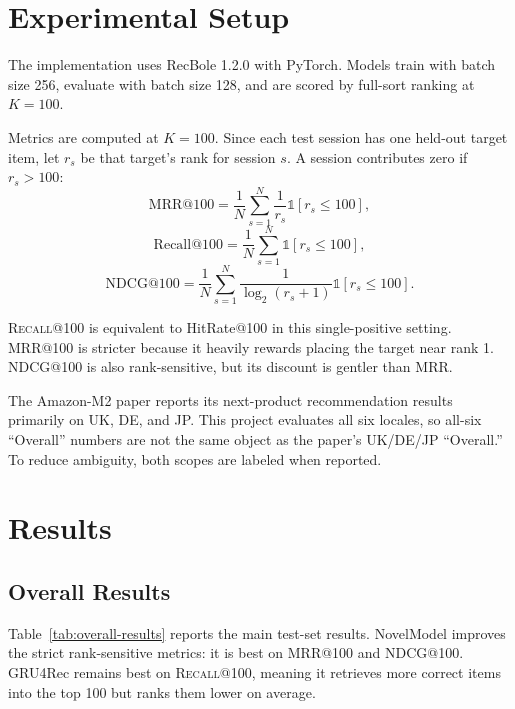 \documentclass[11pt]{article}
\newcommand{\metric}[1]{\textsc{#1}}
\begin{document}
\section{Experimental Setup}

The implementation uses RecBole 1.2.0 with PyTorch. Models train with batch size 256, evaluate with batch size 128, and are scored by full-sort ranking at \(K=100\).

Metrics are computed at \(K=100\). Since each test session has one held-out target item, let \(r_s\) be that target's rank for session \(s\). A session contributes zero if \(r_s > 100\):
\[
  \mathrm{MRR@100}
  = \frac{1}{N}\sum_{s=1}^{N}
    \frac{1}{r_s}\mathbb{1}[r_s \le 100],
\]
\[
  \mathrm{Recall@100}
  = \frac{1}{N}\sum_{s=1}^{N}
    \mathbb{1}[r_s \le 100],
\]
\[
  \mathrm{NDCG@100}
  = \frac{1}{N}\sum_{s=1}^{N}
    \frac{1}{\log_2(r_s+1)}\mathbb{1}[r_s \le 100].
\]

\metric{Recall@100} is equivalent to HitRate@100 in this single-positive setting. \metric{MRR@100} is stricter because it heavily rewards placing the target near rank 1. \metric{NDCG@100} is also rank-sensitive, but its discount is gentler than MRR.

The Amazon-M2 paper reports its next-product recommendation results primarily on UK, DE, and JP. This project evaluates all six locales, so all-six ``Overall'' numbers are not the same object as the paper's UK/DE/JP ``Overall.'' To reduce ambiguity, both scopes are labeled when reported.

\section{Results}

\subsection{Overall Results}

Table~\ref{tab:overall-results} reports the main test-set results. NovelModel improves the strict rank-sensitive metrics: it is best on \metric{MRR@100} and \metric{NDCG@100}. GRU4Rec remains best on \metric{Recall@100}, meaning it retrieves more correct items into the top 100 but ranks them lower on average.
\end{document}
